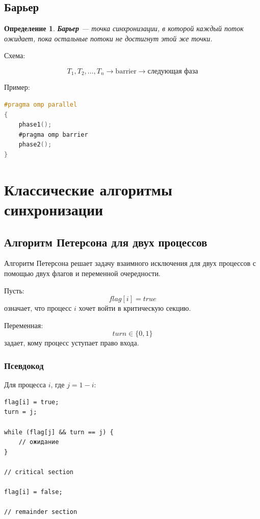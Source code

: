 \documentclass[12pt,a4paper]{article}
\newtheorem{definition}{Определение}
\begin{document}
\subsection{Барьер}

\begin{definition}
\textbf{Барьер} --- точка синхронизации, в которой каждый поток ожидает, пока остальные потоки не достигнут этой же точки.
\end{definition}

Схема:

\[
T_1,T_2,\dots,T_n \longrightarrow \text{barrier}
\longrightarrow \text{следующая фаза}
\]

Пример:

\begin{lstlisting}[language=C]
#pragma omp parallel
{
    phase1();
    #pragma omp barrier
    phase2();
}
\end{lstlisting}

\section{Классические алгоритмы синхронизации}

\subsection{Алгоритм Петерсона для двух процессов}

Алгоритм Петерсона решает задачу взаимного исключения для двух процессов с помощью двух флагов и переменной очередности.

Пусть:
\[
flag[i] = true
\]
означает, что процесс $i$ хочет войти в критическую секцию.

Переменная:
\[
turn \in \{0,1\}
\]
задает, кому процесс уступает право входа.

\subsubsection{Псевдокод}

Для процесса $i$, где $j = 1 - i$:

\begin{lstlisting}
flag[i] = true;
turn = j;

while (flag[j] && turn == j) {
    // ожидание
}

// critical section

flag[i] = false;

// remainder section
\end{lstlisting}
\end{document}
